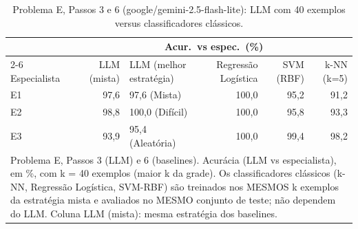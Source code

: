 \begin{table}[htbp]
\centering
\small
\caption{Problema E, Passos 3 e 6 (google/gemini-2.5-flash-lite): LLM com 40 exemplos versus classificadores clássicos.}
\label{tab:bloco2_E_passo6_baselines_flashlite}
\begin{tabular}{lrlrrr}
\toprule
 & \multicolumn{5}{c}{Acur.\ vs espec.\ (\%)} \\ \cmidrule(lr){2-6}
Especialista & LLM (mista) & LLM (melhor estratégia) & Regressão Logística & SVM (RBF) & k-NN (k=5) \\
\midrule
E1 & 97,6 & 97,6 (Mista) & 100,0 & 95,2 & 91,2 \\
E2 & 98,8 & 100,0 (Difícil) & 100,0 & 95,8 & 93,3 \\
E3 & 93,9 & 95,4 (Aleatória) & 100,0 & 99,4 & 98,2 \\
\bottomrule
\multicolumn{6}{p{0.95\linewidth}}{\footnotesize Problema E, Passos 3 (LLM) e 6 (baselines). Acurácia (LLM vs especialista), em \%, com k = 40 exemplos (maior k da grade). Os classificadores clássicos (k-NN, Regressão Logística, SVM-RBF) são treinados nos MESMOS k exemplos da estratégia mista e avaliados no MESMO conjunto de teste; não dependem do LLM. Coluna LLM (mista): mesma estratégia dos baselines.} \\
\end{tabular}
\end{table}
